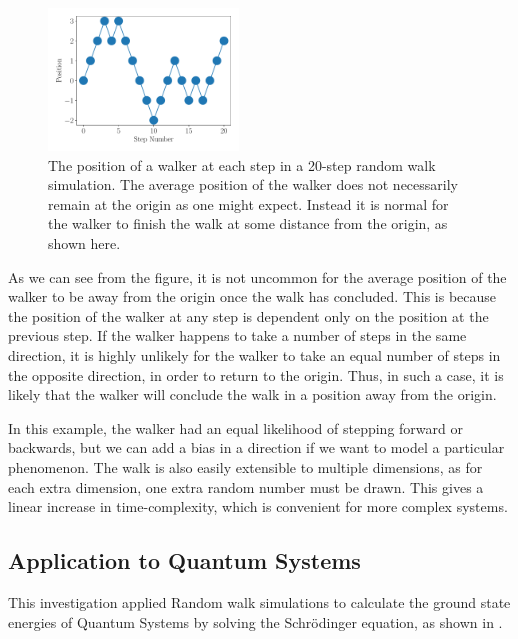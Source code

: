 \documentclass[journal]{IEEEtran}
\begin{document}
\begin{figure}[H]%
  \begin{center}
    \includegraphics[width=0.45\textwidth]{images/cartoon.pdf}
    \caption{The position of a walker at each step in a 20-step random walk
      simulation. The average position of the walker does not necessarily remain
      at the origin as one might expect. Instead it is normal for the
      walker to finish the walk at some distance from the origin, as shown here.}
    \label{fig:cartoon}
  \end{center}
\end{figure}

As we can see from the figure, it is not uncommon for the average position of
the walker to be away from the origin once the walk has concluded. This is
because the position of the walker at any step is dependent only on the position
at the previous step. If the walker happens to take a number of steps in the
same direction, it is highly unlikely for the walker to take an equal number of
steps in the opposite direction, in order to return to the origin. Thus, in such
a case, it is likely that the walker will conclude the walk in a position away
from the origin.

In this example, the walker had an equal likelihood of stepping forward or
backwards, but we can add a bias in a direction if we want to model a particular
phenomenon. The walk is also easily extensible to multiple dimensions, as for
each extra dimension, one extra random number must be drawn. This gives a linear
increase in time-complexity, which is convenient for more complex systems.

\subsection{Application to Quantum Systems}

This investigation applied Random walk simulations to calculate the ground state
energies of Quantum Systems by solving the Schr\"{o}dinger equation, as shown in
\cite{Ceperley1983}.
\end{document}
